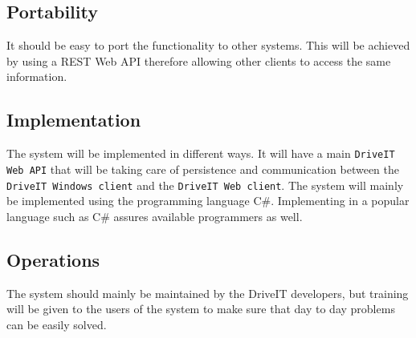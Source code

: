 \subsection{Portability}
It should be easy to port the functionality to other systems. This will be achieved by using a REST Web API therefore allowing other clients to access the same information. 
\subsection{Implementation}
The system will be implemented in different ways. It will have a main \texttt{DriveIT Web API} that will be taking care of persistence and communication between the \texttt{DriveIT Windows client} and the \texttt{DriveIT Web client}. The system will mainly be implemented using the programming language C\#. Implementing in a popular language such as C\# assures available programmers as well.
\subsection{Operations}
The system should mainly be maintained by the DriveIT developers, but training will be given to the users of the system to make sure that day to day problems can be easily solved.
